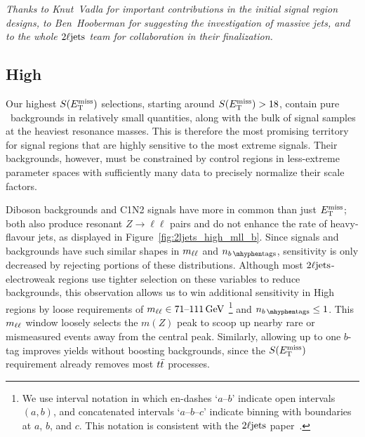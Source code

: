 \emph{%
Thanks to Knut~Vadla for important contributions in the initial signal region
designs, to Ben~Hooberman for suggesting the investigation of massive jets,
and to the whole $\twoljets$ team for collaboration in their finalization.%
}


\subsection{High}
\label{sec:2ljets_high}
Our highest $\metsig$ selections, starting around $\metsig > 18$, contain
pure \diboson\ backgrounds in relatively small quantities, along with the bulk
of signal samples at the heaviest resonance masses.
This is therefore the most promising territory for signal regions that are
highly sensitive to the most extreme signals.
Their backgrounds, however, must be constrained by control regions in
less-extreme parameter spaces with sufficiently many data to precisely
normalize their scale factors.

Diboson backgrounds and C1N2 signals have more in common than just $\met$;
both also produce resonant $Z\to \ell\ell$ pairs
and do not enhance the rate of heavy-flavour jets, as displayed in
Figure~\ref{fig:2ljets_high_mll_b}.
Since signals and backgrounds have such similar shapes in $\mll$ and $\nbtag$,
sensitivity is only decreased by rejecting portions of these distributions.
Although most $\twoljets$-electroweak regions use tighter selection on these
variables to reduce backgrounds, this observation allows us to win
additional sensitivity in High regions by loose requirements
of $\mll \in 71\textrm{--}111\,\eV[G]$%
\footnote{%
We use interval notation in which
en-dashes `$a\textrm{--}b$' indicate open intervals $(a, b)$, and
concatenated intervals `$a\textrm{--}b\textrm{--}c$' indicate binning
with boundaries at $a$, $b$, and $c$.
This notation is consistent with the $\twoljets$
paper~\cite{atlas2022searches}.%
}
and $\nbtag \leq 1$.
This $\mll$ window loosely selects the $m(Z)$ peak to scoop up nearby rare or
mismeasured events away from the central peak.
Similarly, allowing up to one $b$-tag improves yields without boosting
backgrounds, since the $\metsig$ requirement already removes most $\ttbar$
processes.

